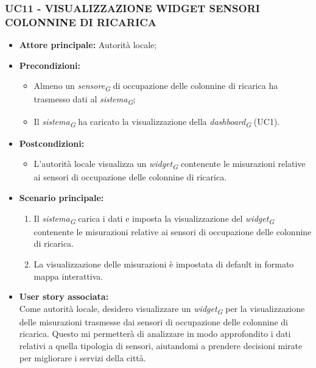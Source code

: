 \subsubsection{UC11 - VISUALIZZAZIONE WIDGET SENSORI COLONNINE DI RICARICA}
\begin{itemize}
    \item \textbf{Attore principale:} Autorità locale;
    \item \textbf{Precondizioni:}
        \begin{itemize}
            \item Almeno un \textit{sensore}\textsubscript{\textit{G}} di occupazione delle colonnine di ricarica ha trasmesso dati al \textit{sistema}\textsubscript{\textit{G}};
            \item Il \textit{sistema}\textsubscript{\textit{G}} ha caricato la visualizzazione della \textit{dashboard}\textsubscript{\textit{G}} (UC1).
        \end{itemize}
    \item \textbf{Postcondizioni:}
        \begin{itemize}
            \item L'autorità locale visualizza un \textit{widget}\textsubscript{\textit{G}} contenente le misurazioni relative ai sensori di occupazione delle colonnine di ricarica.
        \end{itemize}
        \item \textbf{Scenario principale:}
        \begin{enumerate}
            \item Il \textit{sistema}\textsubscript{\textit{G}} carica i dati e imposta la visualizzazione del \textit{widget}\textsubscript{\textit{G}} contenente le misurazioni relative ai sensori di occupazione delle colonnine di ricarica.
            \item La visualizzazione delle misurazioni è impostata di default in formato mappa interattiva.
        \end{enumerate}
    \item \textbf{User story associata:} \\
        Come autorità locale, desidero visualizzare un \textit{widget}\textsubscript{\textit{G}} per la visualizzazione delle misurazioni trasmesse dai sensori di occupazione delle colonnine di ricarica. Questo mi permetterà di analizzare in modo approfondito i dati relativi a quella tipologia di sensori, aiutandomi a prendere decisioni mirate per migliorare i servizi della città.
\end{itemize}


